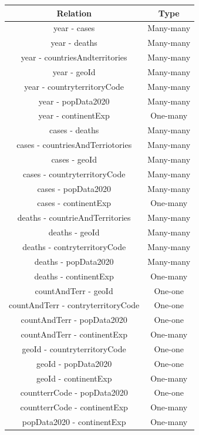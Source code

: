 \documentclass[12pt,oneside,a4paper,english]{article}
\begin{document}
  \begin{tabular}[t]{c c} %
  \hline\hline %
  \textbf{Relation} & \textbf{Type} \\ [0.3ex]
  \hline %
  year - cases & Many-many\\ [0.3ex]
  year - deaths & Many-many\\ [0.3ex]
  year - countriesAndterritories & Many-many\\ [0.3ex]
  year - geoId & Many-many\\ [0.3ex]
  year - countryterritoryCode & Many-many\\ [0.3ex]
  year - popData2020 & Many-many\\ [0.3ex]
  year - continentExp & One-many\\ [0.3ex]
  cases - deaths & Many-many\\ [0.3ex]
  cases - countriesAndTerriotories & Many-many\\ [0.3ex]
  cases - geoId & Many-many\\ [0.3ex]
  cases - countryterritoryCode & Many-many\\ [0.3ex]
  cases - popData2020 & Many-many\\ [0.3ex]
  cases - continentExp & One-many\\ [0.3ex]
  deaths - countrieAndTerritories & Many-many\\ [0.3ex]
  deaths - geoId & Many-many\\ [0.3ex]
  deaths - contryterritoryCode & Many-many\\ [0.3ex]
  deaths - popData2020 & Many-many\\ [0.3ex]
  deaths - continentExp &One-many\\ [0.3ex]
  countAndTerr - geoId & One-one\\ [0.3ex]
  countAndTerr - contryterritoryCode & One-one\\ [0.3ex]
  countAndTerr - popData2020 & One-one\\ [0.3ex]
  countAndTerr - continentExp & One-many\\ [0.3ex]
  geoId - countryterritoryCode & One-one\\ [0.3ex]
  geoId - popData2020 & One-one\\ [0.3ex]
  geoId - continentExp & One-many\\ [0.3ex]
  countterrCode - popData2020 & One-one\\ [0.3ex]
  countterrCode - continentExp & One-many\\ [0.3ex]
  popData2020 - continentExp & One-many\\ [0.3ex]
  \hline
\end{tabular}
\end{document}
